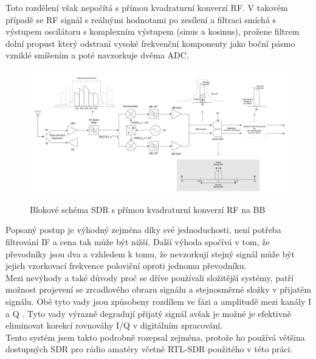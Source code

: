 \documentclass{ctuthesis}
\begin{document}
Toto rozdělení však nepočítá s přímou kvadraturní konverzí RF. V takovém případě se RF signál s reálnými hodnotami po zesílení a filtraci smíchá s výstupem oscilátoru s komplexním výstupem (sinus a kosinus), prožene filtrem dolní propust který odstraní vysoké frekvenční komponenty jako boční pásmo vzniklé smíšením a poté navzorkuje dvěma ADC.\cite{andrasretzler2014}\\
\begin{figure}
\caption{Blokové schéma SDR s přímou kvadraturní konverzí RF na BB\cite{directdown2013}}
\includegraphics[width=1\textwidth]{./images/principSDR.png}
\label{principSDR}
\end{figure}
Popsaný postup je výhodný zejména díky své jednoduchosti, není potřeba filtrování IF a cena tak může být nižší. Další výhoda spočívá v tom, že převodníky jsou dva a vzhledem k tomu, že nevzorkují stejný signál může být jejich vzorkovací frekvence poloviční oproti jednomu převodníku.\\
Mezi nevýhody a také důvody proč se dříve používali složitější systémy, patří možnost projevení se zrcadlového obrazu signálu a stejnosměrné složky v přijatém signálu. Obě tyto vady jsou způsobeny rozdílem ve fázi a amplitudě mezi kanály I a Q . Tyto vady výrazně degradují přijatý signál avšak je možné je efektivně eliminovat korekcí rovnováhy I/Q v digitálním zpracování.\\
Tento systém jsem takto podrobně rozepsal zejména, protože ho používá většina dostupných SDR pro rádio amatéry včetně RTL-SDR použitého v této práci.
\end{document}
